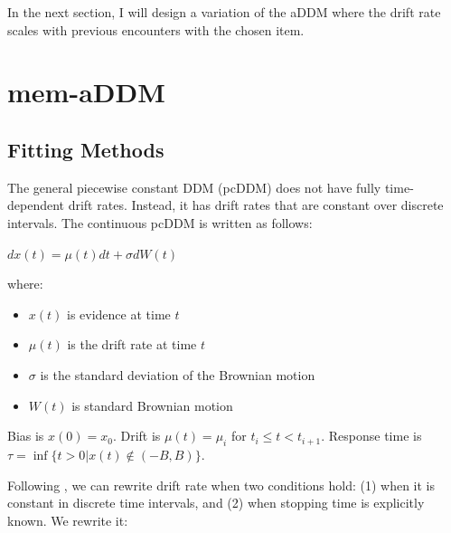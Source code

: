\documentclass[
]{book}
\providecommand{\tightlist}{%
  \setlength{\itemsep}{0pt}\setlength{\parskip}{0pt}}
\begin{document}
In the next section, I will design a variation of the aDDM where the drift rate scales with previous encounters with the chosen item.

\hypertarget{mem-addm}{%
\section{mem-aDDM}\label{mem-addm}}

\hypertarget{fitting-methods}{%
\subsection{Fitting Methods}\label{fitting-methods}}

The general piecewise constant DDM (pcDDM) does not have fully time-dependent drift rates. Instead, it has drift rates that are constant over discrete intervals. The continuous pcDDM is written as follows:

\(dx(t) = \mu(t) dt + \sigma dW(t)\)

where:

\begin{itemize}
\tightlist
\item
  \(x(t)\) is evidence at time \(t\)
\item
  \(\mu(t)\) is the drift rate at time \(t\)
\item
  \(\sigma\) is the standard deviation of the Brownian motion
\item
  \(W(t)\) is standard Brownian motion
\end{itemize}

Bias is \(x(0)=x_0\). Drift is \(\mu(t)=\mu_i\) for \(t_i \leq t < t_{i+1}\). Response time is \(\tau = \inf\{t>0|x(t)\not\in(-B,B)\}\).

Following \citep{lombardi2021}, we can rewrite drift rate when two conditions hold: (1) when it is constant in discrete time intervals, and (2) when stopping time is explicitly known. We rewrite it:
\end{document}
